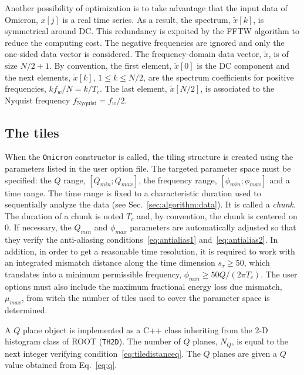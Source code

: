 Another possibility of optimization is to take advantage that the input data of Omicron, $x[j]$ is a real time series. As a result, the spectrum, $\tilde{x}[k]$, is symmetrical around DC. This redundancy is expoited by the FFTW algorithm to reduce the computing cost. The negative frequencies are ignored and only the one-sided data vector is considered. The frequency-domain data vector, $\tilde{x}$, is of size $N/2+1$. By convention, the first element, $\tilde{x}[0]$ is the DC component and the next elements, $\tilde{x}[k]$, $1\le k \le N/2$, are the spectrum coefficients for positive frequencies, $kf_w/N=k/T_c$. The last element, $\tilde{x}[N/2]$, is associated to the Nyquist frequency $f_{\text{Nyquist}}=f_w/2$. 

\subsection{The tiles} \label{sec:algorithm:tiling}

When the \texttt{Omicron} constructor is called, the tiling structure is created using the parameters listed in the user option file. The targeted parameter space must be specified: the $Q$ range, $[Q_{min}; Q_{max}]$, the frequency range, $[\phi_{min}; \phi_{max}]$ and a time range. The time range is fixed to a characteristic duration used to sequentially analyze the data (see Sec.~\ref{sec:algorithm:data}). It is called a \textit{chunk}. The duration of a chunk is noted $T_c$ and, by convention, the chunk is centered on 0. If necessary, the $Q_{min}$ and $\phi_{max}$ parameters are automatically adjusted so that they verify the anti-aliasing conditions~\ref{eq:antialias1} and~\ref{eq:antialias2}. In addition, in order to get a reasonable time resolution, it is required to work with an integrated mismatch distance along the time dimension $s_\tau\ge50$, which translates into a minimum permissible frequency, $\phi_{min} \ge 50Q/(2\pi T_c)$.
The user options must also include the maximum fractional energy loss due mismatch, $\mu_{max}$, from witch the number of tiles used to cover the parameter space is determined.

A $Q$ plane object is implemented as a C++ class inheriting from the 2-D histogram class of ROOT (\texttt{TH2D}). The number of $Q$ planes, $N_Q$, is equal to the next integer verifying condition~\ref{eq:tiledistanceq}. The $Q$ planes are given a $Q$ value obtained from Eq.~\ref{eq:q}.

